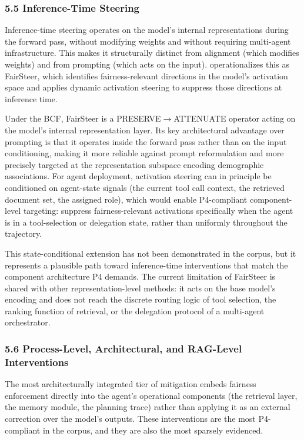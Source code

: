 \documentclass[10pt]{article}
\begin{document}
\subsubsection*{5.5 Inference-Time Steering}

Inference-time steering operates on the model's internal representations during the forward pass, without modifying weights and without requiring multi-agent infrastructure. This makes it structurally distinct from alignment (which modifies weights) and from prompting (which acts on the input). \cite{li2025fairsteer} operationalizes this as FairSteer, which identifies fairness-relevant directions in the model's activation space and applies dynamic activation steering to suppress those directions at inference time.

Under the BCF, FairSteer is a PRESERVE$\rightarrow$ATTENUATE operator acting on the model's internal representation layer. Its key architectural advantage over prompting is that it operates inside the forward pass rather than on the input conditioning, making it more reliable against prompt reformulation and more precisely targeted at the representation subspace encoding demographic associations. For agent deployment, activation steering can in principle be conditioned on agent-state signals (the current tool call context, the retrieved document set, the assigned role), which would enable P4-compliant component-level targeting: suppress fairness-relevant activations specifically when the agent is in a tool-selection or delegation state, rather than uniformly throughout the trajectory.

This state-conditional extension has not been demonstrated in the corpus, but it represents a plausible path toward inference-time interventions that match the component architecture P4 demands. The current limitation of FairSteer is shared with other representation-level methods: it acts on the base model's encoding and does not reach the discrete routing logic of tool selection, the ranking function of retrieval, or the delegation protocol of a multi-agent orchestrator.

\subsubsection*{5.6 Process-Level, Architectural, and RAG-Level Interventions}

The most architecturally integrated tier of mitigation embeds fairness enforcement directly into the agent's operational components (the retrieval layer, the memory module, the planning trace) rather than applying it as an external correction over the model's outputs. These interventions are the most P4-compliant in the corpus, and they are also the most sparsely evidenced.
\end{document}
